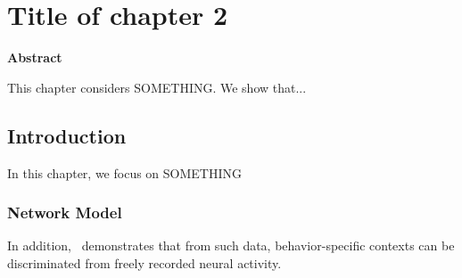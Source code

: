 
\chapter{Title of chapter 2}


  \begin{center}
  \textbf{\LARGE Abstract}
  \end{center}

  This chapter considers SOMETHING.
  We show that...

\clearpage

\section{Introduction} 

In this chapter, we focus on SOMETHING

\subsection{Network Model}


In addition,~\cite{alasfour2018coarse} demonstrates that from such data, behavior-specific contexts can be discriminated from freely recorded neural activity.

